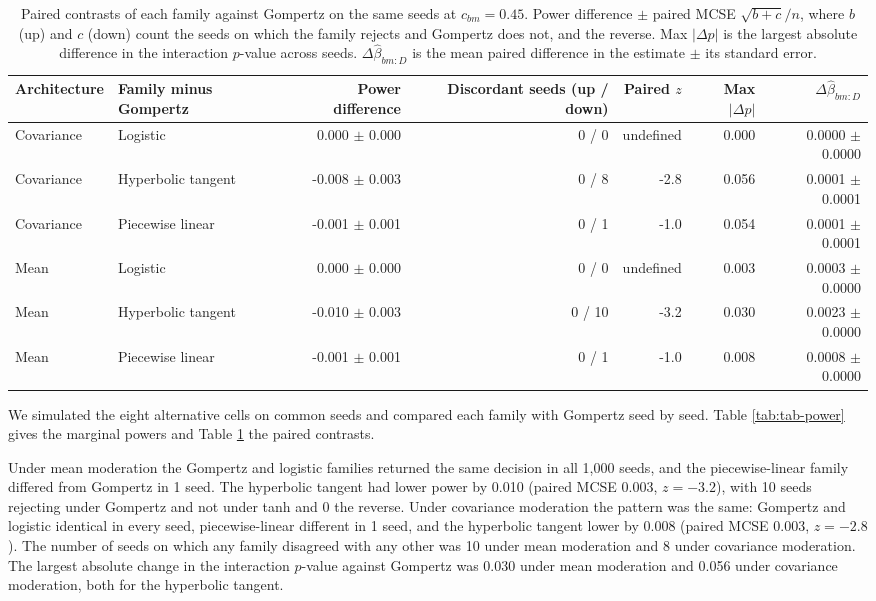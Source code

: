 \documentclass[
  11pt,
]{article}
\begin{document}
\begin{table}

\caption{\label{tab:tab-paired}Paired contrasts of each family against Gompertz on the same seeds at $c_{bm} = 0.45$. Power difference $\pm$ paired MCSE $\sqrt{b + c}/n$, where $b$ (up) and $c$ (down) count the seeds on which the family rejects and Gompertz does not, and the reverse. Max $|\Delta p|$ is the largest absolute difference in the interaction $p$-value across seeds. $\Delta\hat\beta_{bm:D}$ is the mean paired difference in the estimate $\pm$ its standard error.}
\centering
\begin{tabular}[t]{llrrrrr}
\toprule
Architecture & Family minus Gompertz & Power difference & Discordant seeds (up / down) & Paired $z$ & Max $|\Delta p|$ & $\Delta\hat\beta_{bm:D}$\\
\midrule
Covariance & Logistic & 0.000 $\pm$ 0.000 & 0 / 0 & undefined & 0.000 & 0.0000 $\pm$ 0.0000\\
Covariance & Hyperbolic tangent & -0.008 $\pm$ 0.003 & 0 / 8 & -2.8 & 0.056 & 0.0001 $\pm$ 0.0001\\
Covariance & Piecewise linear & -0.001 $\pm$ 0.001 & 0 / 1 & -1.0 & 0.054 & 0.0001 $\pm$ 0.0001\\
Mean & Logistic & 0.000 $\pm$ 0.000 & 0 / 0 & undefined & 0.003 & 0.0003 $\pm$ 0.0000\\
Mean & Hyperbolic tangent & -0.010 $\pm$ 0.003 & 0 / 10 & -3.2 & 0.030 & 0.0023 $\pm$ 0.0000\\
\addlinespace
Mean & Piecewise linear & -0.001 $\pm$ 0.001 & 0 / 1 & -1.0 & 0.008 & 0.0008 $\pm$ 0.0000\\
\bottomrule
\end{tabular}
\end{table}

We simulated the eight alternative cells on common seeds and compared
each family with Gompertz seed by seed. Table \ref{tab:tab-power}
gives the marginal powers and Table \ref{tab:tab-paired} the paired
contrasts.

Under mean moderation the Gompertz and logistic families returned the same decision in all 1,000 seeds, and the piecewise-linear family differed from Gompertz in 1 seed. The hyperbolic tangent had lower power by 0.010 (paired MCSE 0.003, \(z = -3.2\)), with 10 seeds rejecting under Gompertz and not under tanh and 0 the reverse. Under covariance moderation the pattern was the same: Gompertz and logistic identical in every seed, piecewise-linear different in 1 seed, and the hyperbolic tangent lower by 0.008 (paired MCSE 0.003, \(z = -2.8\)). The number of seeds on which any family disagreed with any other was 10 under mean moderation and 8 under covariance moderation. The largest absolute change in the interaction \(p\)-value against Gompertz was 0.030 under mean moderation and 0.056 under covariance moderation, both for the hyperbolic tangent.
\end{document}
